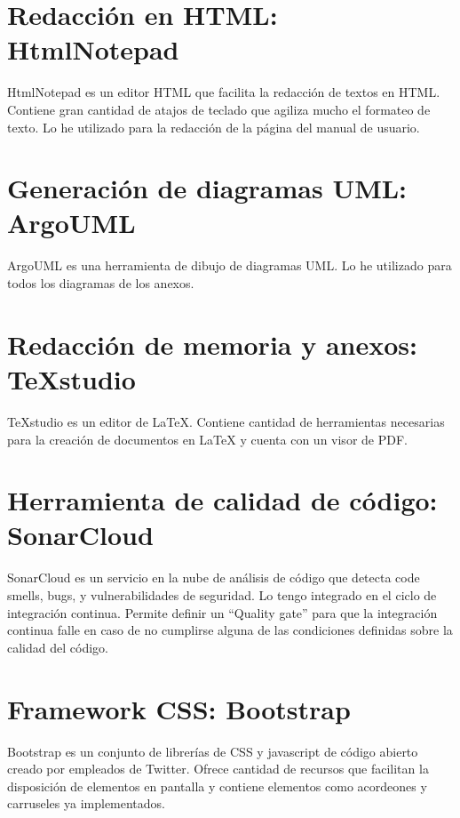 \section{Redacción en HTML: HtmlNotepad}
HtmlNotepad es un editor HTML que facilita la redacción de textos en HTML. Contiene gran cantidad de atajos de teclado que agiliza mucho el formateo de texto. Lo he utilizado para la redacción de la página del manual de usuario.
\section{Generación de diagramas UML: ArgoUML}
ArgoUML es una herramienta de dibujo de diagramas UML. Lo he utilizado para todos los diagramas de los anexos. 
\section{Redacción de memoria y anexos: TeXstudio}
TeXstudio es un editor de LaTeX. Contiene cantidad de herramientas necesarias para la creación de documentos en LaTeX y cuenta con un visor de PDF.
\section{Herramienta de calidad de código: SonarCloud}
SonarCloud es un servicio en la nube de análisis de código que detecta code smells, bugs, y vulnerabilidades de seguridad. Lo tengo integrado en el ciclo de integración continua. Permite definir un ``Quality gate'' para que la integración continua falle en caso de no cumplirse alguna de las condiciones definidas sobre la calidad del código.
\section{Framework CSS: Bootstrap}
Bootstrap es un conjunto de librerías de CSS y javascript de código abierto creado por empleados de Twitter. Ofrece cantidad de recursos que facilitan la disposición de elementos en pantalla y contiene elementos como acordeones y carruseles ya implementados.
 
 
 
